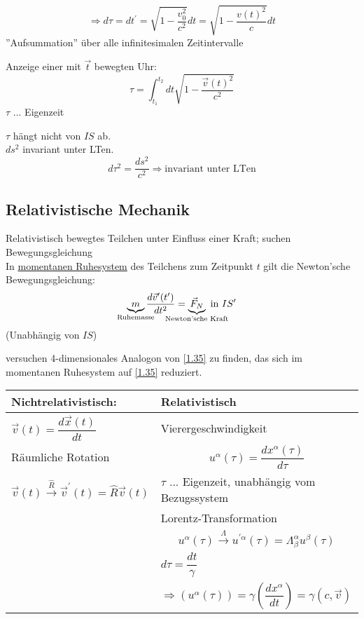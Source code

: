 \documentclass[a4paper, 11pt]{article}
\numberwithin{equation}{section}
\begin{document}
\begin{equation}
\Rightarrow d\tau = dt^\prime = \sqrt{1 - \frac{v_0^2}{c^2}} dt = \sqrt{1 - \frac{v(t)^2}{c}} dt
\end{equation}
''Aufsummation'' über alle infinitesimalen Zeitintervalle


Anzeige einer mit $\vec{t}$ bewegten Uhr:
\begin{equation}
\boxed{
\tau = \int^{t_2}_{t_1} dt \sqrt{1-\frac{\vec{v}(t)^2}{c^2}}}
\end{equation}
$\tau$ ... Eigenzeit

$\tau$ hängt nicht von $IS$ ab.\\
$ds^2$ invariant unter LTen.
\begin{equation}
d\tau^2 = \dfrac{ds^2}{c^2} \Rightarrow \text{invariant unter LTen}
\end{equation}


\subsection*{Relativistische Mechanik}
Relativistisch bewegtes Teilchen unter Einfluss einer Kraft; suchen Bewegungsgleichung\\
In \underline{momentanen Ruhesystem} des Teilchens zum Zeitpunkt $t$ gilt die Newton'sche Bewegungsgleichung:
\begin{equation}
\underbrace{m}_{\mathclap{\text{Ruhemasse}}} \dfrac{d\vec{v}^\prime(t^\prime)}{dt^2} = \underbrace{\vec{F}_N}_{\mathclap{\text{Newton'sche Kraft}}} \text{ in } IS^\prime
\end{equation}
(Unabhängig von $IS$)


versuchen 4-dimensionales Analogon von \ref{1.35} zu finden, das sich im momentanen Ruhesystem auf \ref{1.35} reduziert.

\begin{tabular}{l | p{8cm}}
Nichtrelativistisch: & Relativistisch \\ \hline
$\vec{v}(t)= \dfrac{d\vec{x}(t)}{dt}$ & Vierergeschwindigkeit \\
Räumliche Rotation &  \begin{equation}
u^\alpha(\tau) = \dfrac{dx^\alpha(\tau)}{d\tau}
\end{equation} \\
$\vec{v}(t) \xrightarrow{\hat{R}} \vec{v}^\prime(t) = \hat{R}\vec{v}(t)$ & $\tau$ ... Eigenzeit, unabhängig vom Bezugssystem\\
& Lorentz-Transformation \\
& \begin{equation}
u^\alpha (\tau) \xrightarrow{\Lambda} u^{\prime\alpha}(\tau) = \Lambda^\alpha_\beta u^\beta(\tau)
\end{equation}\\
& $d\tau = \dfrac{dt}{\gamma}$\\
& $\Rightarrow \left(u^\alpha (\tau) \right) = \gamma \left(\dfrac{dx^\alpha}{dt} \right) = \gamma(c, \vec{v}) $
\end{tabular}
\end{document}

